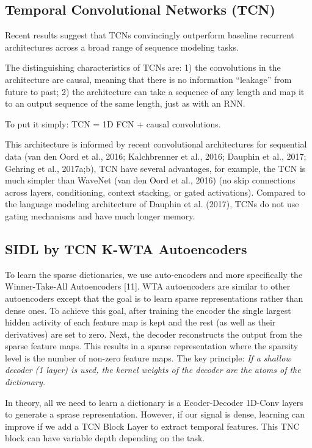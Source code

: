 \documentclass[11pt,a4paper]{article}
\begin{document}
\subsection{Temporal Convolutional Networks (TCN) }

Recent results suggest that TCNs convincingly outperform
baseline recurrent architectures across a broad range of sequence modeling tasks.

The distinguishing characteristics of TCNs are: 1)
the convolutions in the architecture are causal, meaning that
there is no information “leakage” from future to past; 2) the
architecture can take a sequence of any length and map it to
an output sequence of the same length, just as with an RNN.

To put it simply: TCN = 1D FCN + causal convolutions.

This architecture is informed by recent convolutional architectures for sequential data (van den Oord et al., 2016;
Kalchbrenner et al., 2016; Dauphin et al., 2017; Gehring
et al., 2017a;b), TCN have several advantages, for example,
the TCN is much simpler than WaveNet (van den Oord et al.,
2016) (no skip connections across layers, conditioning, context stacking, or gated activations).
Compared to the language modeling architecture of Dauphin
et al. (2017), TCNs do not use gating mechanisms and have
much longer memory. 



\subsection{SIDL by TCN K-WTA Autoencoders}
To learn the sparse dictionaries, we use auto-encoders and more specifically the Winner-Take-All Autoencoders [11]. WTA autoencoders are similar to other autoencoders except that the goal is to learn sparse representations rather than dense ones. To achieve this goal, after training the encoder the single largest hidden activity of each feature map is kept and the rest (as well as their derivatives) are set to zero. Next, the decoder reconstructs the output from the sparse feature maps. This results in a sparse representation where the sparsity level is the number of non-zero feature maps. The key principle: \emph{If a shallow decoder (1 layer) is used, the kernel weights of the decoder are the atoms of the dictionary.}

In theory, all we need to learn a dictionary is a Ecoder-Decoder 1D-Conv layers to generate a sprase representation. However, if our signal is dense, learning can improve if we add a TCN Block Layer to extract temporal features. This TNC block can have variable depth depending on the task.
\end{document}
